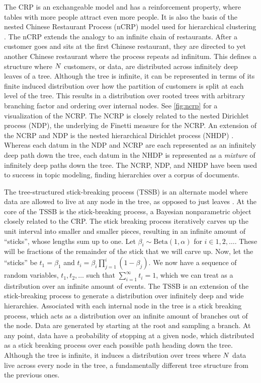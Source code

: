 The CRP is an exchangeable model
and has a reinforcement property, where
tables with more people attract 
even more people. It is
also the basis of the nested Chinese
Restaurant Process (nCRP) model
used for hierarchical clustering \citep{Blei2010}.
The nCRP extends the analogy to
an infinite chain of restaurants.
After a customer goes and sits
at the first Chinese restaurant,
they are directed to yet another
Chinese restaurant where the process
repeats ad infinitum. This defines
a structure where $N$ customers, or data,
are distributed
across infinitely deep leaves of a tree.
Although the tree is infinite,
it can be represented in terms of its
finite induced distribution over
how the partition of customers is split
at each level of the tree. 
This results in a distribution over rooted trees
with arbitrary branching factor and ordering over internal nodes.
See \autoref{fig:ncrp} for a visualization of the NCRP.
The NCRP
is closely related to the nested Dirichlet process (NDP),
the underlying de Finetti measure for the NCRP.
An extension
of the NCRP and NDP is the nested hierarchical Dirichlet
process (NHDP) \citep{Paisley2014}. Whereas each datum in the NDP and NCRP
are each represented as an infinitely deep path
down the tree, each datum in the NHDP
is represented as a \emph{mixture} of
infinitely deep paths down the tree. 
The NCRP, NDP, and NHDP have been used to success
in topic modeling, finding hierarchies over
a corpus of documents.

The tree-structured stick-breaking process (TSSB)
is an alternate model 
where data are allowed to live at any node
in the tree, as opposed to just leaves \citep{Adams2010}.
At the core of the TSSB is the
stick-breaking process, a Bayesian nonparametric object
closely related to the CRP.
The stick breaking process
iteratively carves up the unit interval
into smaller and smaller pieces,
resulting in an infinite amount of ``sticks'',
whose lengths sum up to one.
Let $\beta_i \sim \text{Beta}(1, \alpha)$ for
$i \in 1,2,\ldots$.
These will be fractions of the remainder
of the stick that we will carve up.
Now, let the ``sticks''
be $t_1 = \beta_1$ and $t_i = \beta_i \prod_{j = 1}^i (1 - \beta_j)$.
We now have a sequence of
random variables, $t_1, t_2, \ldots$
such that $\sum_{i = 1}^\infty t_i = 1$,
which we can treat as a distribution over
an infinite amount of events.
The TSSB is an extension of the stick-breaking process
to generate a distribution
over infinitely deep and wide hierarchies.
Associated with each internal node in the tree
is a stick breaking process,
which acts as a distribution over an infinite
amount of branches out of the node.
Data are generated by starting at the root
and sampling a branch. At any point,
data have a probability of stopping at a given node,
which distributed as a stick breaking process
over each possible path heading down the tree.
Although the tree is infinite, it induces a distribution
over trees where $N$ data live across every node
in the tree, a fundamentally different tree structure
from the previous ones.

